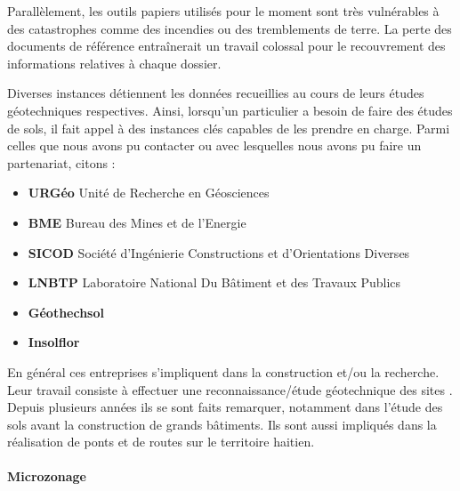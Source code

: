 \par
Parallèlement, les outils papiers utilisés pour le moment sont très vulnérables à des
catastrophes comme des incendies ou des tremblements de terre. La perte 
des documents de référence entraînerait un travail
colossal pour le recouvrement des informations relatives à chaque 
dossier.
\par
Diverses instances détiennent les données recueillies au cours
de leurs études géotechniques respectives. 
Ainsi, lorsqu’un particulier a besoin de faire des études de sols, il 
fait appel à des instances clés capables de les prendre en charge. 
Parmi celles que nous avons pu contacter ou avec lesquelles nous avons pu faire un partenariat, 
citons :
\begin{itemize}
    \item \textbf{URGéo}
    Unité de Recherche en Géosciences \cite{linkurgeo} 
    \item \textbf{BME}
    Bureau des Mines et de l’Energie \cite{linkbme} 
    \item \textbf{SICOD}
    Société d’Ingénierie Constructions et d’Orientations Diverses
    \item \textbf{LNBTP}
    Laboratoire National Du Bâtiment et des Travaux Publics \cite{linklnbtp} 
    \item \textbf{Géothechsol} \cite{linkgeotechsol} 
    \item \textbf{Insolflor} 
\end{itemize}   
  
\par
En général ces entreprises s'impliquent dans la construction et/ou la recherche. 
Leur travail consiste à effectuer une reconnaissance/étude géotechnique des sites .
Depuis plusieurs années ils se sont faits remarquer, notamment dans
l'étude des sols avant la construction de grands bâtiments. Ils sont aussi impliqués
dans la réalisation de ponts et de routes sur le territoire
haitien.
\paragraph{Microzonage}
